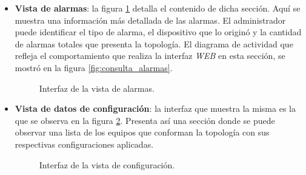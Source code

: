 \begin{itemize}
    \item \textbf{Vista de alarmas}:  la figura \ref{fig:captura_web_alarmas} detalla el contenido de dicha sección. Aquí se muestra una información más detallada de las alarmas. El administrador puede identificar el tipo de alarma, el dispositivo que lo originó y la cantidad de alarmas totales que presenta la topología. El diagrama de actividad que refleja el comportamiento que realiza la interfaz \textit{WEB} en esta sección, se mostró en la figura \ref{fig:consulta_alarmas}.
   
    \begin{figure}[H]
        \centering
        \caption{Interfaz de la vista de alarmas.}
        \label{fig:captura_web_alarmas}
      \end{figure}
    
    \item \textbf{Vista de datos de configuración}: la interfaz que muestra la misma es la que se observa en la figura \ref{fig:captura_web_config}. Presenta así una sección donde se puede observar una lista de los equipos que conforman la topología con sus respectivas configuraciones aplicadas. 
        
    \begin{figure}[H]
        \centering
        \caption{Interfaz de la vista de configuración.}
        \label{fig:captura_web_config}
      \end{figure}


\end{itemize}
